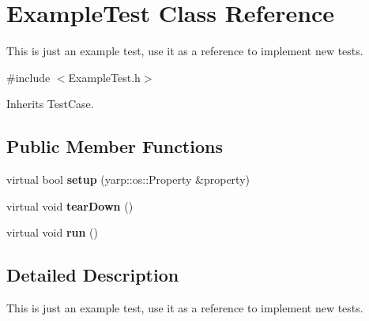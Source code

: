 \section{Example\+Test Class Reference}
\label{classExampleTest}


This is just an example test, use it as a reference to implement new tests.  




{\ttfamily \#include $<$Example\+Test.\+h$>$}



Inherits Test\+Case.

\subsection*{Public Member Functions}
\begin{DoxyCompactItemize}
\item 
\mbox{\label{classExampleTest_a952d7388955c0b21767b06ac53598320}} 
virtual bool {\bfseries setup} (yarp\+::os\+::\+Property \&property)
\item 
\mbox{\label{classExampleTest_a7bc18f291c6b1355e3c6e01817611882}} 
virtual void {\bfseries tear\+Down} ()
\item 
\mbox{\label{classExampleTest_a281e1c9d6ed1826a183dfa137eb779e5}} 
virtual void {\bfseries run} ()
\end{DoxyCompactItemize}


\subsection{Detailed Description}
This is just an example test, use it as a reference to implement new tests. 

